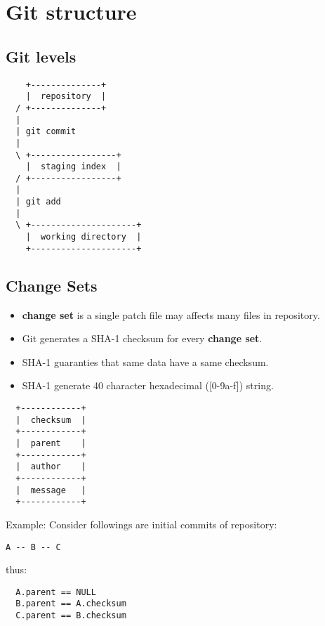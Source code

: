 \documentclass[a4paper,10pt]{article}
\begin{document}
\section{Git structure}\label{git-structure}

\subsection{Git levels}\label{git-levels}

\begin{verbatim}
    +--------------+
    |  repository  |
  / +--------------+
  |
  | git commit
  |
  \ +-----------------+
    |  staging index  |
  / +-----------------+
  |
  | git add
  |
  \ +---------------------+
    |  working directory  |
    +---------------------+
\end{verbatim}

\subsection{Change Sets}\label{change-sets}

\begin{itemize}
\itemsep1pt\parskip0pt
\item
  \textbf{change set} is a single patch file may affects many files in
  repository.
\item
  Git generates a SHA-1 checksum for every \textbf{change set}.
\item
  SHA-1 guaranties that same data have a same checksum.
\item
  SHA-1 generate 40 character hexadecimal ({[}0-9a-f{]}) string.
\end{itemize}

\begin{verbatim}
  +------------+
  |  checksum  |
  +------------+
  |  parent    |
  +------------+
  |  author    |
  +------------+
  |  message   |
  +------------+
\end{verbatim}

Example: Consider followings are initial commits of repository:

\begin{verbatim}
A -- B -- C
\end{verbatim}

thus:

\begin{verbatim}
  A.parent == NULL
  B.parent == A.checksum
  C.parent == B.checksum
\end{verbatim}
\end{document}
